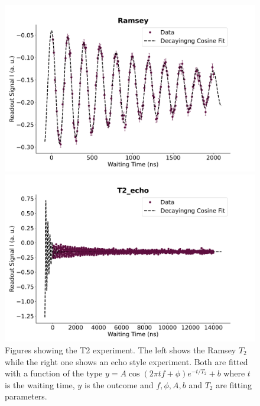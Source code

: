 \begin{figure}[t]
    \begin{minipage}{0.50\linewidth}
        \centering
        \includegraphics[width=1.0\linewidth]{Calibrations/Figures/Ramsey.pdf} %
    \end{minipage}
    \begin{minipage}{0.50\linewidth}
        \centering
        \includegraphics[width=1.0\linewidth]{Calibrations/Figures/T2_echo.pdf} %
    \end{minipage}
    \caption{Figures showing the T2 experiment. The left shows the Ramsey $T_2$ while the right one shows an echo style experiment. Both are fitted with a function of the type $y = A \cos(2 \pi t f + \phi) e^{-t / T_2} + b$ where $t$ is the waiting time, $y$ is the outcome and $f, \phi, A, b$ and $T_2$ are fitting parameters.}
    \label{fig:calibrations_t2}
\end{figure}

